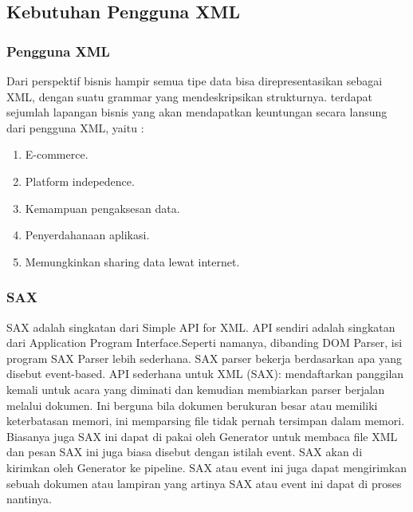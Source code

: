 \subsection {Kebutuhan Pengguna XML}
\subsubsection {Pengguna XML}
Dari perspektif bisnis hampir semua tipe data bisa direpresentasikan sebagai XML, dengan suatu grammar yang mendeskripsikan strukturnya. terdapat sejumlah lapangan bisnis yang akan mendapatkan keuntungan secara lansung dari pengguna XML, yaitu :
\begin{enumerate}
\item E-commerce.
\item Platform indepedence.
\item Kemampuan pengaksesan data.
\item Penyerdahanaan aplikasi.
\item Memungkinkan sharing data lewat internet.
\end{enumerate}


\subsubsection {SAX}
  SAX adalah singkatan dari Simple API for XML. API sendiri adalah singkatan dari Application Program Interface.Seperti namanya, dibanding DOM Parser, isi program SAX Parser lebih sederhana. SAX parser bekerja berdasarkan apa yang disebut event-based. API sederhana untuk XML (SAX): mendaftarkan panggilan kemali untuk acara yang diminati dan kemudian membiarkan parser berjalan melalui dokumen. Ini berguna bila dokumen berukuran besar atau memiliki keterbatasan memori, ini memparsing file tidak pernah tersimpan dalam memori. Biasanya juga SAX ini dapat di pakai oleh Generator untuk membaca file XML dan pesan SAX ini juga biasa disebut dengan istilah event. SAX akan di kirimkan oleh Generator ke pipeline. SAX atau event ini juga dapat mengirimkan sebuah dokumen atau lampiran yang artinya SAX atau event ini dapat di proses nantinya.
  
